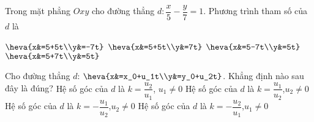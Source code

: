 \begin{ex}%
	Trong mặt phẳng $Oxy$ cho đường thẳng $d\colon \dfrac{x}{5}-\dfrac{y}{7}=1$. Phương trình tham số của $d$ là
	
	\choice
	{$\heva{x&=5+5t\\y&=-7t}$}
	{\True $\heva{x&=5+5t\\y&=7t}$}
	{$\heva{x&=5-7t\\y&=5t}$}
	{$\heva{x&=5+7t\\y&=5t}$}
\end{ex}

\begin{ex}%
	Cho đường thẳng $d$: $\heva{x&=x_0+u_1t\\y&=y_0+u_2t}$. Khẳng định nào sau đây là đúng?
	\choice
	{\True Hệ số góc của $d$ là $k=\dfrac{u_2}{u_1}$, $u_1\neq0$}
	{Hệ số góc của $d$ là $k=\dfrac{u_1}{u_2}$,$u_2\neq0$}
	{Hệ số góc của $d$ là $k=-\dfrac{u_1}{u_2}$,$u_2\neq0$}
	{Hệ số góc của $d$ là $k=-\dfrac{u_2}{u_1}$,$u_1\neq0$}
\end{ex}

